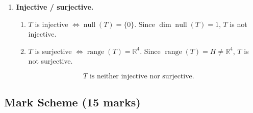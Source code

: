 \documentclass[12pt]{article}
\begin{document}
\begin{enumerate}[label=(\alph*)]
\item \textbf{Injective / surjective.}
\begin{enumerate}[label=(\roman*)]
\item $T$ is injective $\iff \operatorname{null}(T)=\{0\}$. Since $\dim\operatorname{null}(T)=1$, $T$ is not injective.
\item $T$ is surjective $\iff \operatorname{range}(T)=\mathbb{R}^4$. Since $\operatorname{range}(T)=H\ne\mathbb{R}^4$, $T$ is not surjective.
\end{enumerate}
\[
\boxed{\,T\text{ is neither injective nor surjective.}\,}
\]
\end{enumerate}
\vspace{3cm}
\subsection{Mark Scheme (15 marks)}
\end{document}
